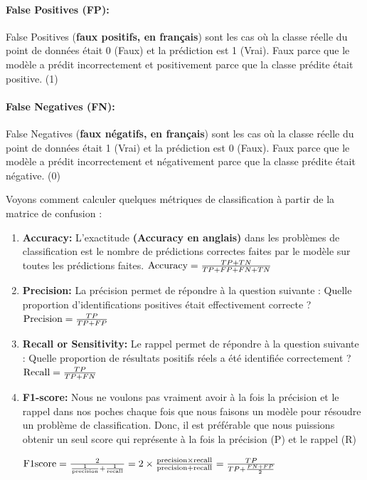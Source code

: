 \documentclass[12pt, french]{report}
\begin{document}
\paragraph*{False Positives (FP):}
False Positives (\textbf{faux positifs, en français}) sont les cas où la classe réelle du point de données était 0 (Faux) et la prédiction est 1 (Vrai). Faux parce que le modèle a prédit incorrectement et positivement parce que la classe prédite était positive. (1)
\paragraph*{False Negatives (FN):}
False Negatives (\textbf{faux négatifs, en français}) sont les cas où la classe réelle du point de données était 1 (Vrai) et la prédiction est 0 (Faux). Faux parce que le modèle a prédit incorrectement et négativement parce que la classe prédite était négative. (0)

Voyons comment  calculer quelques métriques de classification à partir de la matrice de confusion :

\begin{enumerate}
	\item \textbf{Accuracy:}
	L'exactitude \textbf{(Accuracy en anglais)} dans les problèmes de classification est le nombre de prédictions correctes faites par le modèle sur toutes les prédictions faites.
	$\textnormal{Accuracy} = \frac{TP+TN}{TP+ FP + FN + TN} $
	
	\item  \textbf{Precision:} 
	La précision permet de répondre à la question suivante : Quelle proportion d'identifications positives était effectivement correcte ?
	$\textnormal{Precision} = \frac{TP}{TP+ FP} $
	
	\item \textbf{Recall or Sensitivity:}
	Le rappel permet de répondre à la question suivante : Quelle proportion de résultats positifs réels a été identifiée correctement ?
	$\textnormal{Recall} = \frac{TP}{TP+ FN} $
	
	\item \textbf{F1-score:}
	Nous ne voulons pas vraiment avoir à la fois la précision et le rappel dans nos poches chaque fois que nous faisons un modèle pour résoudre un problème de classification. Donc, il est préférable que nous puissions obtenir un seul score qui représente à la fois la précision (P) et le rappel (R)
	
	$ \textnormal{F1score} = \frac{ 2 }{\frac {1}{\textnormal{precision}} +  \frac {1}{\textnormal{recall}}  } = 2 \times \frac{\textnormal{precision} \times \textnormal{recall}} { \textnormal{precision} + \textnormal{recall} } = \frac{TP} {TP + \frac{FN+FP} {2} } $
\end{enumerate}
\end{document}
